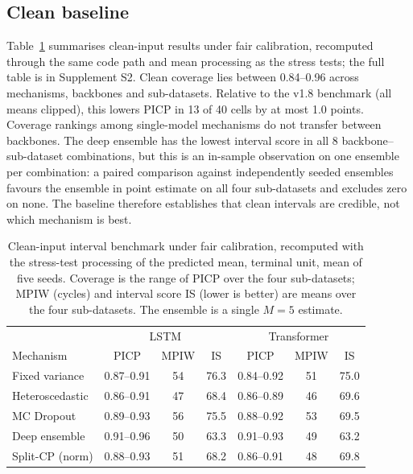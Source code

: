 \documentclass[11pt,a4paper]{article}
\newcommand{\NIndepSigN}{none}
\newcommand{\NIndepPosN}{all four}
\newcommand{\JEnsBestISeight}{8}
\newcommand{\JCleanCovAll}{0.84--0.96}
\newcommand{\JCleanAllShiftMax}{1.0}
\newcommand{\JCleanAllShiftNchg}{13}
\newcommand{\JCleanAllShiftN}{40}
\begin{document}
\subsection{Clean baseline}
Table~\ref{tab:clean} summarises clean-input results under fair calibration, recomputed through the same code path and mean processing as the stress tests; the full table is in Supplement S2. Clean coverage lies between \JCleanCovAll{} across mechanisms, backbones and sub-datasets. Relative to the v1.8 benchmark (all means clipped), this lowers PICP in \JCleanAllShiftNchg{} of \JCleanAllShiftN{} cells by at most \JCleanAllShiftMax{} points. Coverage rankings among single-model mechanisms do not transfer between backbones. The deep ensemble has the lowest interval score in all \JEnsBestISeight{} backbone--sub-dataset combinations, but this is an in-sample observation on one ensemble per combination: a paired comparison against independently seeded ensembles favours the ensemble in point estimate on \NIndepPosN{} sub-datasets and excludes zero on \NIndepSigN. The baseline therefore establishes that clean intervals are credible, not which mechanism is best.

\begin{table}[!t]
\caption{Clean-input interval benchmark under fair calibration, recomputed with the stress-test processing of the predicted mean, terminal unit, mean of five seeds. Coverage is the range of PICP over the four sub-datasets; MPIW (cycles) and interval score IS (lower is better) are means over the four sub-datasets. The ensemble is a single $M=5$ estimate.}
\label{tab:clean}
\centering\small
\begin{tabular}{lccc|ccc}
\toprule
 & \multicolumn{3}{c|}{LSTM} & \multicolumn{3}{c}{Transformer} \\
Mechanism & PICP & MPIW & IS & PICP & MPIW & IS \\
\midrule
Fixed variance & 0.87--0.91 & 54 & 76.3 & 0.84--0.92 & 51 & 75.0 \\
Heteroscedastic & 0.86--0.91 & 47 & 68.4 & 0.86--0.89 & 46 & 69.6 \\
MC Dropout & 0.89--0.93 & 56 & 75.5 & 0.88--0.92 & 53 & 69.5 \\
Deep ensemble & 0.91--0.96 & 50 & 63.3 & 0.91--0.93 & 49 & 63.2 \\
Split-CP (norm) & 0.88--0.93 & 51 & 68.2 & 0.86--0.91 & 48 & 69.8 \\
\bottomrule
\end{tabular}
\end{table}
\end{document}
